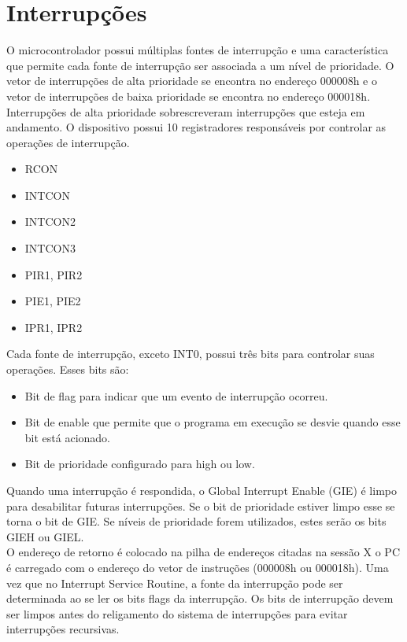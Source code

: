 \documentclass[12pt]{article}
\begin{document}
\section{Interrupções}
O microcontrolador possui múltiplas fontes de interrupção e uma característica que permite cada fonte de interrupção ser associada a um nível de prioridade. O vetor de interrupções de alta prioridade se encontra no endereço 000008h e o vetor de interrupções de baixa prioridade se encontra no endereço 000018h. Interrupções de alta prioridade sobrescreveram interrupções que esteja em andamento. O dispositivo possui 10 registradores responsáveis por controlar as operações de interrupção.
\begin{itemize}
	\item RCON
	\item INTCON
	\item INTCON2
	\item INTCON3
	\item PIR1, PIR2
	\item PIE1, PIE2
	\item IPR1, IPR2 
\end{itemize}
Cada fonte de interrupção, exceto INT0, possui três bits para controlar suas operações. Esses bits são:
\begin{itemize}
	\item Bit de flag para indicar que um evento de interrupção ocorreu. 
	\item Bit de enable que permite que o programa em execução se desvie quando esse bit está acionado. 
	\item Bit de prioridade configurado para high ou low. 
\end{itemize}
Quando uma interrupção é respondida, o Global Interrupt Enable (GIE) é limpo para desabilitar futuras interrupções. Se o bit de prioridade estiver limpo esse se torna o bit de GIE. Se níveis de prioridade forem utilizados, estes serão os bits GIEH ou GIEL.
\\O endereço de retorno é colocado na pilha de endereços citadas na sessão X o PC é carregado com o endereço do vetor de instruções (000008h ou 000018h). Uma vez que no Interrupt Service Routine, a fonte da interrupção pode ser determinada ao se ler os bits flags da interrupção. Os bits de interrupção devem ser limpos antes do religamento do sistema de interrupções para evitar interrupções recursivas.
\end{document}
